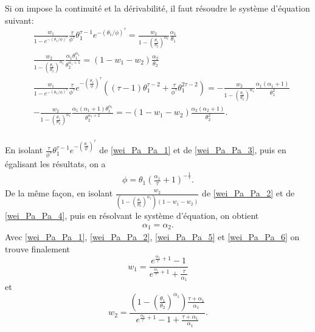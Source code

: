 	Si on impose la continuité et la dérivabilité, il faut résoudre le système d'équation suivant:
	\begin{align}
		&\frac{w_1}{1-e^{-\left(\theta_1/\phi\right)^{\tau}}} \frac{\tau}{\phi^{\tau}} \theta_1^{\tau -1} e^{- \left(\theta_1/\phi\right)^{\tau} }
		= \frac{w_2}{1-\left(\frac{\theta_1}{\theta_2}\right)^{\alpha_1}} \frac{\alpha_1}{\theta_1} \label{wei_Pa_Pa_1}  \\
		&\frac{w_2}{1-\left(\frac{\theta_1}{\theta_2}\right)^{\alpha_1}} \frac{\alpha_1 \theta_1^{\alpha_1}}{\theta_2^{\alpha_1+1}} = (1-w_1-w_2) \frac{\alpha_2}{\theta_2} \label{wei_Pa_Pa_2}\\
		&\frac{w_1}{1-e^{-\left(\theta_1/\phi\right)^{\tau}}}
		\frac{\tau}{\phi^{\tau}}  e^{- \left(\frac{\theta_1}{\phi}\right)^{\tau} }
		((\tau -1) \theta_1^{\tau -2}+\frac{\tau}{\phi^{\tau}} \theta_1^{2\tau -2})
		= -\frac{w_2}{1-\left(\frac{\theta_1}{\theta_2}\right)^{\alpha_1}} \frac{\alpha_1 (\alpha_1+1)}{\theta_1^2} \label{wei_Pa_Pa_3}\\
		&-\frac{w_2}{1-\left(\frac{\theta_1}{\theta_2}\right)^{\alpha_1}} \frac{\alpha_1  (\alpha_1+1) \theta_1^{\alpha_1}}{\theta_2^{\alpha_1+2}} =- (1-w_1-w_2) \frac{\alpha_2  (\alpha_2+1)}{\theta_2^2} \label{wei_Pa_Pa_4}. \\
	\end{align}
	
	En isolant $	\frac{\tau}{\phi^{\tau}} \theta_1^{\tau -1} e^{- \left(\frac{\theta_1}{\phi}\right)^{\tau} }$ de \ref{wei_Pa_Pa_1} et de \ref{wei_Pa_Pa_3}, puis en égalisant les résultats, on a 
	\begin{align}
	\phi = \theta_1 \left(\frac{\alpha_1}{\tau}+1\right)^{- \frac{1}{\tau}}\label{wei_Pa_Pa_5}.
	\end{align}
	De la même façon, en isolant $\frac{w_2}{\left(1-\left(\frac{\theta_1}{\theta_2}\right)^{\alpha_1}\right) (1-w_1-w_2)}$ de \ref{wei_Pa_Pa_2} et de \ref{wei_Pa_Pa_4}, puis en résolvant le système d'équation, on obtient
	\begin{align}
	\alpha_1 = \alpha_2\label{wei_Pa_Pa_6}.
	\end{align}
	Avec \ref{wei_Pa_Pa_1}, \ref{wei_Pa_Pa_2}, \ref{wei_Pa_Pa_5} et \ref{wei_Pa_Pa_6} on trouve finalement
	$$w_1 = \frac{e^{\frac{\alpha_1}{\tau}+1}-1}{e^{\frac{\alpha_1}{\tau}+1}+\frac{\tau}{\alpha_1}}$$
	et 
	$$w_2 = \frac{\left(1-\left(\frac{\theta_1}{\theta_2}\right)^{\alpha_1} \right) \frac{\tau+\alpha_1}{\alpha_1}}{e^{\frac{\alpha_1}{\tau}+1} -1 + \frac{\tau+\alpha_1}{\alpha_1}}.$$
	

